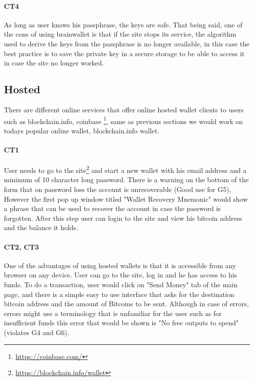 \paragraph{CT4} As long as user knows his passphrase, the keys are safe. That being said, one of the cons of using brainwallet is that if the site stops its service, the algorithm used to derive the keys from the passphrase is no longer available, in this case the best practice is to save the private key in a secure storage to be able to access it in case the site no longer worked.


\subsection{Hosted}
\label{hosted}
There are different online services that offer online hosted wallet clients to users such as blockchain.info, coinbase \footnote{\url{https://coinbase.com/}}, same as previous sections we would work on todays popular online wallet, blockchain.info wallet.

\paragraph{CT1} User needs to go to the site\footnote{\url{https://blockchain.info/wallet}} and start a new wallet with his email address and a minimum of 10 character long password. There is a warning on the bottom of the form that on password loss the account is unrecoverable (Good use for G5), However the first pop up window titled "Wallet Recovery Mnemonic" would show a phrase that can be used to recover the account in case the password is forgotten. After this step user can login to the site and view his bitcoin address and the balance it holds.

\paragraph{CT2, CT3}
\label{hosted transaction}
One of the advantages of using hosted wallets is that it is accessible from any browser on any device. User can go to the site, log in and he has access to his funds. To do a transaction, user would click on "Send Money" tab of the main page, and there is a simple easy to use interface that asks for the destination bitcoin address and the amount of Bitcoins to be sent. Although in case of errors, errors might use a terminology that is unfamiliar for the user such as for insufficient funds this error that would be shown is "No free outputs to spend" (violates G4 and G6).

